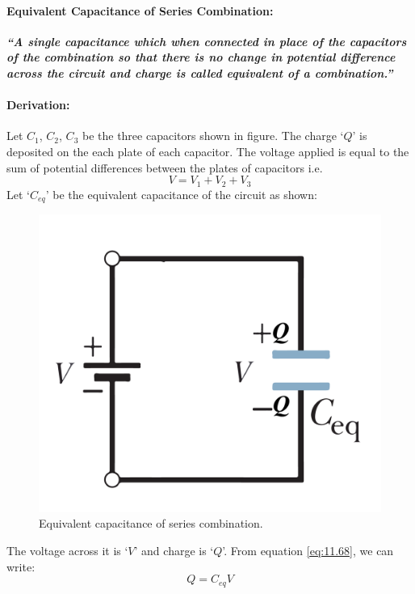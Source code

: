 \paragraph{Equivalent Capacitance of Series Combination:}
\textit{\textbf{“A single capacitance which when connected in place of
the capacitors of the combination so that there is no change in potential
difference across the circuit and charge is called equivalent of a
combination.”}}
\paragraph{Derivation:}
Let $C_{1}$, $C_{2}$,
$C_{3}$ be the three capacitors shown in figure.
The charge `$Q$' is
deposited on the each plate of each capacitor.
The voltage applied is equal to
the sum of potential differences between the plates of capacitors i.e.
\begin{equation}\label{eq:11.76}
  V = V_{1} + V_{2} + V_{3}
\end{equation}
Let `$C_{eq}$' be the equivalent capacitance of the circuit as shown:
\begin{figure}[H]
  \centering
  \includegraphics[scale = 0.45]{Images/Chapter-11/11.32}
  \caption{Equivalent capacitance of series combination.}
  \label{fig:11.32}
\end{figure}
The voltage across it is `$V$' and charge is `$Q$'.
From equation \ref{eq:11.68}, we can write:
\begin{equation}\nonumber
  Q =  C_{eq}V
\end{equation}
